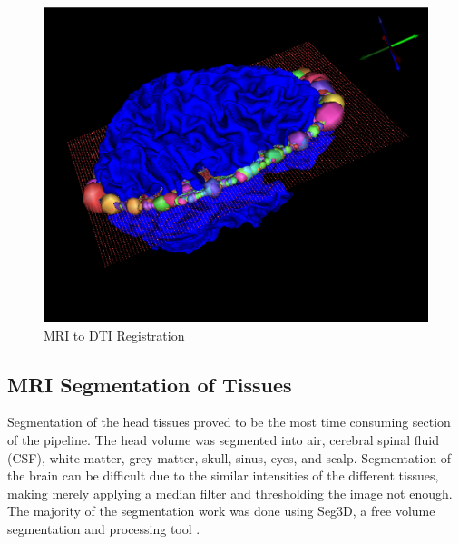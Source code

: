 \begin{figure}[H]
\begin{center}
\includegraphics[width=.75\textwidth]{Figures/DTI_reg}
\caption{MRI to DTI Registration}
\label{fig:dtireg}
\end{center}
\end{figure}

\subsection{MRI Segmentation of Tissues}
\label{sec:Seg}


Segmentation of the head tissues proved to be the most time consuming section of the pipeline. The head volume was segmented into air, cerebral spinal fluid (CSF), white matter, grey matter, skull, sinus, eyes, and scalp. Segmentation of the brain can be difficult due to the similar intensities of the different tissues, making merely applying a median filter and thresholding the image not enough. The majority of the segmentation work was done using Seg3D, a free volume segmentation and processing tool \cite{ref:seg3d}.

